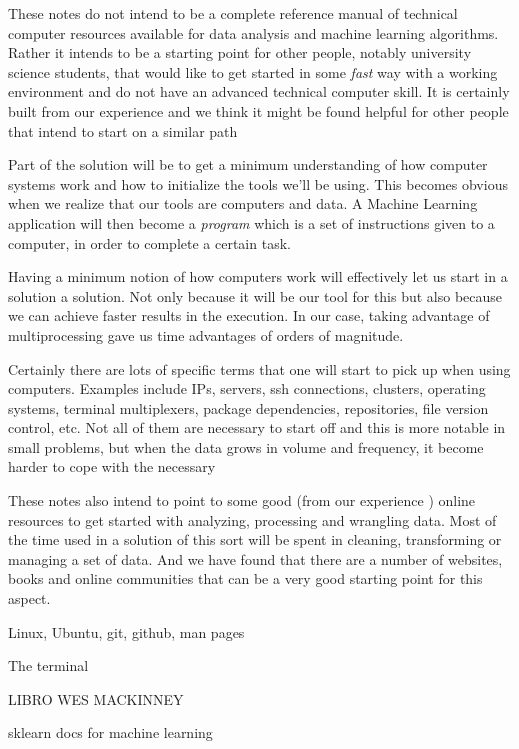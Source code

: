 \documentclass{article}%
\theoremstyle{definition}
\begin{document}
These notes do not intend to be a complete reference manual of technical computer resources available for data analysis and machine learning algorithms. Rather it intends to be a starting point for other people, notably university science students, that would like to get started in some \textit{fast} way with a working environment and do not have an advanced technical computer skill. It is certainly built from our experience and we think it might be found helpful for other people that intend to start on a similar path

Part of the solution will be to get a minimum understanding of how computer systems work and how to initialize the tools we'll be using. This becomes obvious when we realize that our tools are computers and data. A Machine Learning application will then become a \textit{program} which is a set of instructions given to a computer, in order to complete a certain task.

Having a minimum notion of how computers work will effectively let us start in a solution a solution. Not only because it will be our tool for this
but also because we can achieve faster results in the execution. In our case, taking advantage of multiprocessing gave us time advantages of orders of magnitude. 

Certainly there are lots of specific terms that one will start to pick up when using computers. Examples include IPs, servers, ssh connections, clusters, operating systems, terminal multiplexers, package dependencies, repositories, file version control, etc. Not all of them are necessary to start off and this is more notable in small problems, but when the data grows in volume and frequency, it become harder to cope with the necessary

These notes also intend to point to some good (from our experience ) online resources to get started with analyzing, processing and wrangling data. Most of the time used in a solution of this sort will be spent in cleaning, transforming or managing a set of data. And we have found that there are a number of websites, books and online communities that can be a very good starting point for this aspect.




Linux, Ubuntu, git, github, man pages


The terminal



LIBRO WES MACKINNEY \cite{McKinney-pandas}

sklearn docs for machine learning \cite{scikit-learn}
\end{document}
